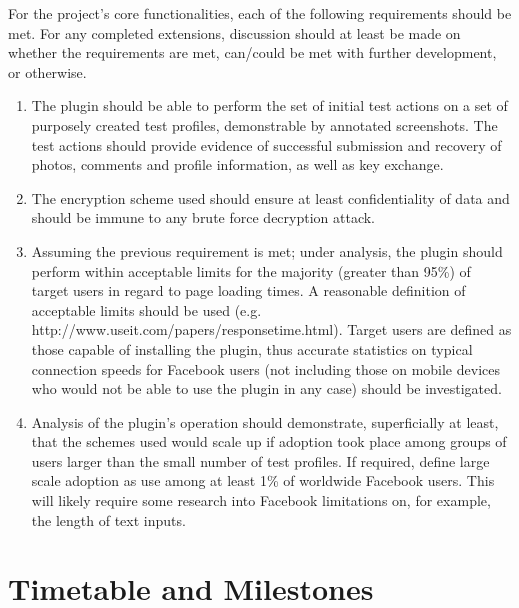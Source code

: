 For the project's core functionalities, each of the following requirements should be met. For any completed extensions, discussion should at least be made on whether the requirements are met, can/could be met with further development, or otherwise.

\begin{enumerate}

\item The plugin should be able to perform the set of initial test actions on a set of purposely created test profiles, demonstrable by annotated screenshots. The test actions should provide evidence of successful submission and recovery of photos, comments and profile information, as well as key exchange.

\item The encryption scheme used should ensure at least confidentiality of data and should be immune to any brute force decryption attack.

\item Assuming the previous requirement is met; under analysis, the plugin should perform within acceptable limits for the majority (greater than 95\%) of target users in regard to page loading times. A reasonable definition of acceptable limits should be used (e.g. http://www.useit.com/papers/responsetime.html). Target users are defined as those capable of installing the plugin, thus accurate statistics on typical connection speeds for Facebook users (not including those on mobile devices who would not be able to use the plugin in any case) should be investigated.

\item Analysis of the plugin's operation should demonstrate, superficially at least, that the schemes used would scale up if adoption took place among groups of users larger than the small number of test profiles. If required, define large scale adoption as use among at least 1\% of worldwide Facebook users. This will likely require some research into Facebook limitations on, for example, the length of text inputs.


\end{enumerate}







\section*{Timetable and Milestones}

